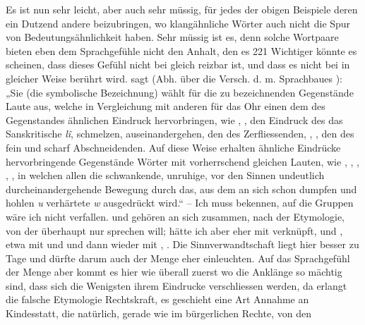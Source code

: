 {Es ist nun sehr leicht, aber auch sehr müssig, für jedes der obigen Beispiele deren ein Dutzend andere beizubringen, wo klangähnliche Wörter auch nicht die Spur von Bedeutungsähnlichkeit haben. Sehr müssig ist es, denn solche Wortpaare bieten eben dem Sprachgefühle nicht den Anhalt, den es  {\textbar}{\textbar}221{\textbar}{\textbar}\label{sp.221}  Wichtiger könnte es scheinen, dass dieses Gefühl nicht bei  gleich reizbar ist, und dass es nicht bei  in gleicher Weise berührt wird.  sagt (Abh. über die Versch. d. m. Sprachbaues ): „Sie (die symbolische Bezeichnung) wählt für die zu bezeichnenden Gegenstände Laute aus, welche  \label{fp.28} in Vergleichung mit anderen für das Ohr einen dem des Gegen\-\label{fp.220}standes ähnlichen Eindruck hervorbringen, wie , ,  den Eindruck des  das Sanskritische \textit{lî}, schmelzen, auseinandergehen, den des Zerfliessenden, , ,  den des fein und scharf Abschneidenden. Auf diese Weise erhalten ähnliche Eindrücke hervorbringende Gegenstände Wörter mit vorherrschend gleichen Lauten, wie , , , , , in welchen allen die schwankende, unruhige, vor den Sinnen undeutlich durcheinandergehende Bewegung durch das, aus dem an sich schon dumpfen und hohlen \textit{u} verhärtete \textit{w} ausgedrückt wird.“ – Ich muss bekennen, auf die  Gruppen wäre ich nicht verfallen.  und  gehören an sich zusammen, nach der  Etymologie, von der  überhaupt nur sprechen will;  hätte ich aber eher mit  verknüpft, und ,  etwa mit  und  und dann wieder mit , . Die Sinnverwandtschaft liegt hier besser zu Tage und dürfte darum auch der Menge eher einleuchten. Auf das Sprachgefühl der Menge aber kommt es hier wie überall zuerst  wo die Anklänge so mächtig sind, dass sich die Wenigsten ihrem Eindrucke verschliessen werden, da erlangt die falsche Etymologie Rechtskraft, es geschieht eine Art Annahme an Kindesstatt, die natürlich, gerade wie im bürgerlichen Rechte, von den }

